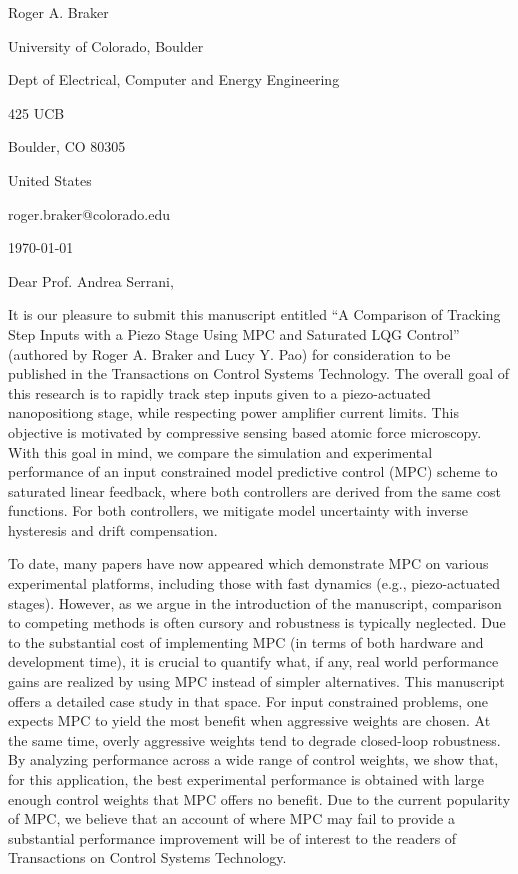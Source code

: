 \documentclass[a4paper,twoside]{article}
\begin{document}
\hspace*{0.45\linewidth}
\begin{minipage}{0.52\linewidth}
Roger A. Braker\par
University of Colorado, Boulder\par
Dept of Electrical, Computer and Energy Engineering \par
425 UCB\par
Boulder, CO 80305\par
United States\par
roger.braker@colorado.edu\par
\today
\end{minipage}
\par\bigskip

Dear Prof. Andrea Serrani,\par\bigskip

It is our pleasure to submit this manuscript entitled ``A Comparison of Tracking Step Inputs with a Piezo Stage Using MPC and Saturated LQG Control'' (authored by Roger A. Braker and Lucy Y. Pao) for consideration to be published in the Transactions on Control Systems Technology.
The overall goal of this research is to rapidly track step inputs given to a piezo-actuated nanopositiong stage, while respecting power amplifier current limits. This objective is motivated by compressive sensing based atomic force microscopy. With this goal in mind, we compare the simulation and experimental performance of an input constrained model predictive control (MPC) scheme to saturated linear feedback, where both controllers are derived from the same cost functions. For both controllers, we mitigate model uncertainty with inverse hysteresis and drift compensation. 

To date, many papers have now appeared which demonstrate MPC on various experimental platforms, including those with fast dynamics (e.g., piezo-actuated stages). However, as we argue in the introduction of the manuscript, comparison to competing methods is often cursory and robustness is typically neglected. Due to the substantial cost of implementing MPC (in terms of both hardware and development time), it is crucial to quantify what, if any, real world performance gains are realized by using MPC instead of simpler alternatives. This manuscript offers a detailed case study in that space. For input constrained problems, one expects MPC to yield the most benefit when aggressive weights are chosen. At the same time, overly aggressive weights tend to degrade closed-loop robustness. By analyzing performance across a wide range of control weights, we show that, for this application, the best experimental performance is obtained with large enough control weights that MPC offers no benefit. Due to the current popularity of MPC, we believe that an account of where MPC may fail to provide a substantial performance improvement will be of interest to the readers of Transactions on Control Systems Technology.
\end{document}
